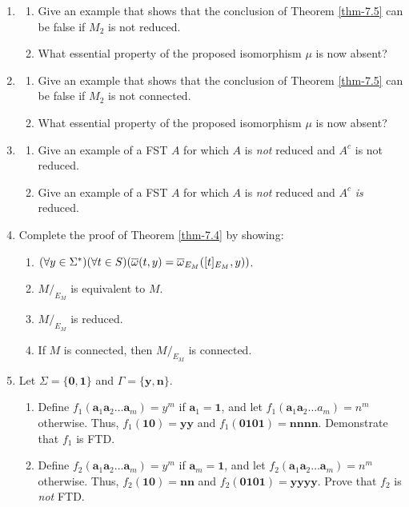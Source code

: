 \begin{enumerate}[{7.}1.]
\item \begin{enumerate}
\item Give an example that shows that the conclusion of Theorem \ref{thm-7.5} can be
false if $M_2$ is not reduced.
\item What essential property of the proposed isomorphism $\mu$ is now absent?
\end{enumerate}

\item \begin{enumerate}
\item Give an example that shows that the conclusion of Theorem \ref{thm-7.5} can be
false if $M_2$ is not connected.
\item What essential property of the proposed isomorphism $\mu$ is now absent?
\end{enumerate}

\item \begin{enumerate}
\item Give an example of a FST $A$ for which $A$ is \emph{not} reduced and $A^c$
is not reduced.
\item Give an example of a FST $A$ for which $A$ is \emph{not} reduced and $A^c$
\emph{is} reduced.
\end{enumerate}

\item Complete the proof of Theorem \ref{thm-7.4} by showing:
\begin{enumerate}
\item $(\forall y \in \Sigma^*)(\forall t \in S)(\overline{\omega}(t,y) =
	\overline{\omega}_{E_M}([t]_{E_M},y))$.
\item $M/  _{E_M}$ is equivalent to $M$.
\item $M/  _{E_M}$ is reduced.
\item If $M$ is connected, then $M/  _{E_M}$ is connected.
\end{enumerate}

\item Let $\Sigma=\{\pmb{0},\pmb{1}\}$ and $\Gamma=\{\pmb{y},\pmb{n}\}$.
\begin{enumerate}
\item Define $f_1(\pmb{a}_1\pmb{a}_2\ldots \pmb{a}_m)=y^m$ if $\pmb{a}_1=
\pmb{1}$, and let $f_1(\pmb{a}_1\pmb{a}_2\ldots a_m) = n^m$ otherwise. Thus,
$f_1(\pmb{10})=\pmb{yy}$ and $f_1(\pmb{0101})=\pmb{nnnn}$. Demonstrate that
$f_1$ is FTD.
\item Define $f_2(\pmb{a}_1\pmb{a}_2\ldots \pmb{a}_m)=y^m$ if $\pmb{a}_m=
\pmb{1}$, and let $f_2(\pmb{a}_1\pmb{a}_2\ldots \pmb{a}_m)=n^m$ otherwise. Thus,
$f_2(\pmb{10})=\pmb{nn}$ and $f_2(\pmb{0101})=\pmb{yyyy}$. Prove that $f_2$ is
\emph{not} FTD.
\end{enumerate}


\end{enumerate}
